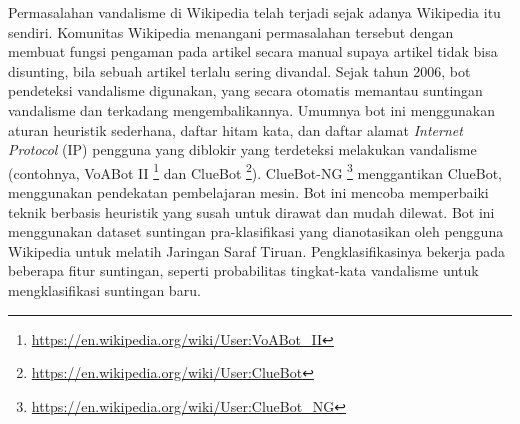 Permasalahan vandalisme di Wikipedia telah terjadi sejak adanya Wikipedia itu
sendiri.
Komunitas Wikipedia menangani permasalahan tersebut dengan membuat fungsi
pengaman pada artikel secara manual supaya artikel tidak bisa disunting, bila
sebuah artikel terlalu sering divandal.
Sejak tahun 2006, bot pendeteksi vandalisme digunakan, yang secara otomatis
memantau suntingan vandalisme dan terkadang mengembalikannya.
Umumnya bot ini menggunakan aturan heuristik sederhana, daftar hitam kata, dan
daftar alamat \textit{Internet Protocol} (IP) pengguna yang
diblokir yang terdeteksi melakukan vandalisme (contohnya, VoABot II
\footnote{\url{https://en.wikipedia.org/wiki/User:VoABot_II}}
dan ClueBot
\footnote{\url{https://en.wikipedia.org/wiki/User:ClueBot}}).
ClueBot-NG
\footnote{\url{https://en.wikipedia.org/wiki/User:ClueBot_NG}}
menggantikan ClueBot, menggunakan pendekatan pembelajaran mesin.
Bot ini mencoba memperbaiki teknik berbasis heuristik yang susah untuk dirawat
dan mudah dilewat.
Bot ini menggunakan dataset suntingan pra-klasifikasi yang dianotasikan oleh
pengguna Wikipedia untuk melatih Jaringan Saraf Tiruan.
Pengklasifikasinya bekerja pada beberapa fitur suntingan, seperti probabilitas
tingkat-kata vandalisme untuk mengklasifikasi suntingan baru.
